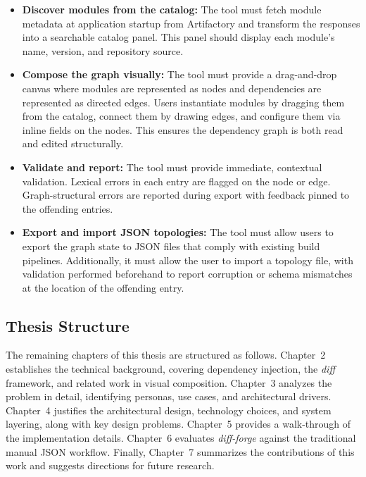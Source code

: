 \begin{itemize}
    \item \textbf{Discover modules from the catalog:} The tool must fetch module metadata at application startup from Artifactory and transform the responses into a searchable catalog panel. This panel should display each module's name, version, and repository source.
    \item \textbf{Compose the graph visually:} The tool must provide a drag-and-drop canvas where modules are represented as nodes and dependencies are represented as directed edges. Users instantiate modules by dragging them from the catalog, connect them by drawing edges, and configure them via inline fields on the nodes. This ensures the dependency graph is both read and edited structurally.
    \item \textbf{Validate and report:} The tool must provide immediate, contextual validation. Lexical errors in each entry are flagged on the node or edge. Graph-structural errors are reported during export with feedback pinned to the offending entries.
    \item \textbf{Export and import JSON topologies:} The tool must allow users to export the graph state to JSON files that comply with existing build pipelines. Additionally, it must allow the user to import a topology file, with validation performed beforehand to report corruption or schema mismatches at the location of the offending entry.
\end{itemize}

\subsection{Thesis Structure}
The remaining chapters of this thesis are structured as follows. Chapter~2 establishes the technical background, covering dependency injection, the \textit{diff} framework, and related work in visual composition. Chapter~3 analyzes the problem in detail, identifying personas, use cases, and architectural drivers. Chapter~4 justifies the architectural design, technology choices, and system layering, along with key design problems. Chapter~5 provides a walk-through of the implementation details. Chapter~6 evaluates \textit{diff-forge} against the traditional manual JSON workflow. Finally, Chapter~7 summarizes the contributions of this work and suggests directions for future research.